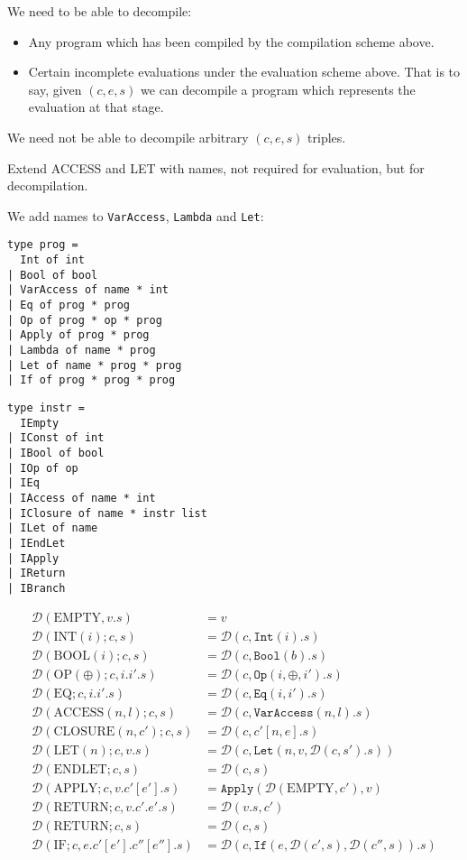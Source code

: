 \documentclass[11pt]{article}
\begin{document}
We need to be able to decompile:

\begin{itemize}
\item Any program which has been compiled by the compilation scheme above.
\item Certain incomplete evaluations under the evaluation scheme above. That is to say, given $(c, e, s)$ we can decompile a program which represents the evaluation at that stage.
\end{itemize}

\noindent We need not be able to decompile arbitrary $(c, e, s)$ triples.

Extend ACCESS and LET with names, not required for evaluation, but for decompilation.



\bigskip

\noindent We add names to \texttt{VarAccess}, \texttt{Lambda} and \texttt{Let}:

\begin{verbatim}
type prog =
  Int of int
| Bool of bool
| VarAccess of name * int
| Eq of prog * prog
| Op of prog * op * prog
| Apply of prog * prog
| Lambda of name * prog
| Let of name * prog * prog
| If of prog * prog * prog\end{verbatim}

\begin{verbatim}type instr =
  IEmpty
| IConst of int
| IBool of bool
| IOp of op
| IEq
| IAccess of name * int
| IClosure of name * instr list
| ILet of name
| IEndLet
| IApply
| IReturn
| IBranch\end{verbatim}


\begin{align*}
\mathcal{D}(\text{EMPTY}, v.s) &= v\\
\mathcal{D}(\text{INT}(i); c, s) &= \mathcal{D}(c, \texttt{Int}(i).s)\\
\mathcal{D}(\text{BOOL}(i); c, s) &= \mathcal{D}(c, \texttt{Bool}(b).s)\\
\mathcal{D}(\text{OP}(\oplus); c, i.i'.s) &= \mathcal{D}(c, \texttt{Op}(i, \oplus, i').s) \\
\mathcal{D}(\text{EQ}; c, i.i'.s) &= \mathcal{D}(c, \texttt{Eq}(i, i').s)\\
\mathcal{D}(\text{ACCESS}(n, l); c, s) &= \mathcal{D}(c, \texttt{VarAccess}(n, l).s)\\
\mathcal{D}(\text{CLOSURE}(n, c'); c, s) &= \mathcal{D}(c, c'[n, e].s)\\
\mathcal{D}(\text{LET}(n); c, v.s) &= \mathcal{D}(c, \texttt{Let}(n, v, \mathcal{D}(c, s').s))\\
\mathcal{D}(\text{ENDLET}; c, s) &= \mathcal{D}(c, s)\\
\mathcal{D}(\text{APPLY}; c, v.c'[e'].s) &= \texttt{Apply}(\mathcal{D}(\text{EMPTY}, c'), v)\\
\mathcal{D}(\text{RETURN}; c, v.c'.e'.s) &= \mathcal{D}(v.s, c')\\
\mathcal{D}(\text{RETURN}; c, s) &= \mathcal{D}(c, s)\\
\mathcal{D}(\text{IF}; c, e.c'[e'].c''[e''].s) &= \mathcal{D}(c, \texttt{If}(e, \mathcal{D}(c', s), \mathcal{D}(c'', s)).s)
\end{align*}
\end{document}
